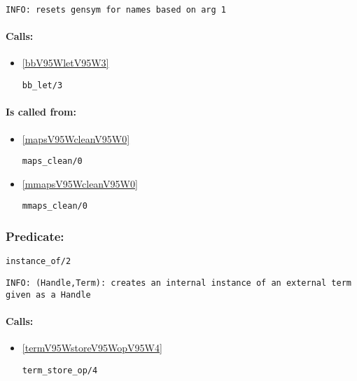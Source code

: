 {\small \begin{verbatim}
INFO: resets gensym for names based on arg 1

\end{verbatim}}
\paragraph{Calls:} 
\begin{itemize}
\item \ref{bbV95WletV95W3} 
\begin{verbatim}
bb_let/3
\end{verbatim}

\end{itemize}
\paragraph{Is called from:} 
\begin{itemize}
\item \ref{mapsV95WcleanV95W0} 
\begin{verbatim}
maps_clean/0
\end{verbatim}

\item \ref{mmapsV95WcleanV95W0} 
\begin{verbatim}
mmaps_clean/0
\end{verbatim}

\end{itemize}

\subsubsection{Predicate:} \label{instanceV95WofV95W2}

\begin{verbatim}
instance_of/2
\end{verbatim}

{\small \begin{verbatim}
INFO: (Handle,Term): creates an internal instance of an external term given as a Handle

\end{verbatim}}
\paragraph{Calls:} 
\begin{itemize}
\item \ref{termV95WstoreV95WopV95W4} 
\begin{verbatim}
term_store_op/4
\end{verbatim}

\end{itemize}

